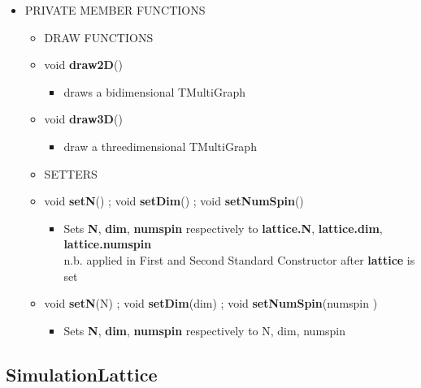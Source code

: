 \documentclass[11pt,a4paper]{article}
\begin{document}
\begin{itemize}
	\item[] PRIVATE MEMBER FUNCTIONS \\ 
	\begin{itemize}
			
		\item[] DRAW FUNCTIONS
			\item[] void \textbf{draw2D}()		 
			\begin{itemize}
				\item[] draws a bidimensional TMultiGraph
			\end{itemize}
			
			\item[] void \textbf{draw3D}()  		 
			\begin{itemize}
				\item[] draw a threedimensional TMultiGraph
			\end{itemize}
			
		\item[] SETTERS
			
			\item[] void \textbf{setN}() ; void \textbf{setDim}() ; void \textbf{setNumSpin}()				
			\begin{itemize}
				\item[]
						{\small
						 Sets \textbf{N}, \textbf{dim}, \textbf{num\textunderscore spin} respectively to 
						\textbf{lattice.N}, \textbf{lattice.dim}, \textbf{lattice.num\textunderscore spin} 
						\\
						\textsf{n.b.}
						applied in First and Second Standard Constructor after \textbf{lattice} is set 
						}
			\end{itemize}
			
			\item[] void \textbf{setN}(\textunderscore N) ;
					void \textbf{setDim}(\textunderscore dim) ;
					void \textbf{setNumSpin}(\textunderscore num\textunderscore spin ) 	
			\begin{itemize}
				\item[] Sets \textbf{N}, \textbf{dim}, \textbf{num\textunderscore spin} respectively to 
						\textunderscore N, \textunderscore dim, \textunderscore num\textunderscore spin
			\end{itemize}	
				
	\end{itemize}

	
\end{itemize}

\newpage


\subsection*{SimulationLattice}
\end{document}
